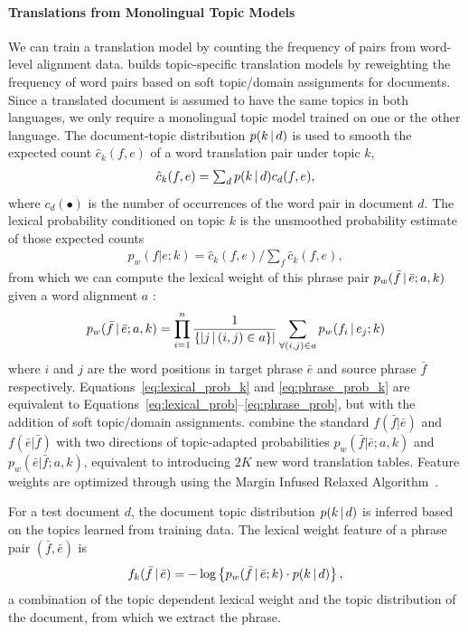 \paragraph{Translations from Monolingual Topic Models}

We can train a translation model by counting the frequency of pairs from word-level alignment data.
\citet{Eidelman-12} builds topic-specific translation models by reweighting the frequency of word pairs based on soft topic/domain assignments for documents.
Since a translated document is assumed to have the same topics in both languages, we only require a monolingual topic model trained on one or the other language.
The document-topic distribution $p(k \, | \, d)$ is used
to smooth the expected count $\hat{c}_{k}(f,e)$ of a word translation
pair under topic $k$,
\begin{align}
\textstyle \hat{c}_{k}(f,e) = \sum_{d}{p(k \, | \, d)c_d(f,e)},
\end{align}
where $c_d(\bullet)$ is the number of occurrences of the word pair in
document $d$.  The lexical probability conditioned on topic $k$ is the
unsmoothed probability estimate of those expected counts
\begin{align}
\label{eq:lexical_prob_k}
\textstyle p_w(f|e;k) = \hat{c}_{k}(f,e) / \sum_f{\hat{c}_{k}(f,e)},
\end{align}
from which we can compute the lexical weight of this phrase pair
$p_w(\bar{f} \, | \, \bar{e};a, k)$ given a word alignment $a$ \citep{koehn-03}:
\begin{align}
\label{eq:phrase_prob_k}
p_w(\bar{f} \, | \, \bar{e};a, k) = \prod^{n}_{i=1} \frac{1}{\{|j \, | \, (i, j) \in a\}|} \sum_{\forall (i,j) \in a} p_w(f_i \, | \, e_j; k)
\end{align}
where $i$ and $j$ are the word positions in target phrase $\bar{e}$
and source phrase $\bar{f}$ respectively. 
Equations~\ref{eq:lexical_prob_k} and \ref{eq:phrase_prob_k} are equivalent to Equations~\ref{eq:lexical_prob}--\ref{eq:phrase_prob}, but with the addition of soft topic/domain assignments.
\citet{Eidelman-12} combine the standard $f(\bar{f}|\bar{e})$ and
$f(\bar{e}|\bar{f})$ with two directions of
topic-adapted probabilities 
$p_w(\bar{f} | \bar{e};a, k)$ and $p_w(\bar{e} | \bar{f};a, k)$, equivalent to introducing $2K$ new word translation tables. 
Feature weights are optimized through
using the Margin Infused Relaxed
  Algorithm~\cite[\textsc{mira}]{Crammer-06}.

For a test document $d$, the document topic distribution $p(k \, | \, d)$ is
inferred based on the topics learned from training data. The lexical
weight feature of a phrase pair $(\bar{f}, \bar{e})$ is
\begin{align}
\textstyle f_{k}(\bar{f} \, | \, \bar{e})=-\log\left\{{p_{w}(\bar{f} \, | \,
  \bar{e};k)\cdot p(k \, | \, d)}\right\},
\end{align}
a combination of the topic dependent lexical weight and the topic
distribution of the document, from which we extract the phrase.

